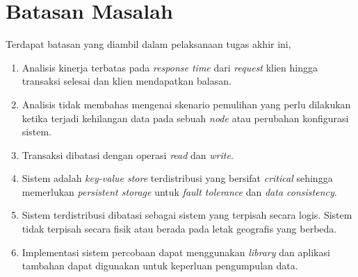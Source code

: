 \section{Batasan Masalah}
\label{sec:batasan-masalah}

Terdapat batasan yang diambil dalam pelaksanaan tugas akhir ini,

\begin{enumerate}
    \item Analisis kinerja terbatas pada \textit{response time} dari \textit{request} klien hingga transaksi selesai dan klien mendapatkan balasan.
    \item Analisis tidak membahas mengenai skenario pemulihan yang perlu dilakukan ketika terjadi kehilangan data pada sebuah \textit{node} atau perubahan konfigurasi sistem. 
    \item Transaksi dibatasi dengan operasi \textit{read} dan \textit{write}.
    \item Sistem adalah \textit{key-value store} terdistribusi yang bersifat \textit{critical} sehingga memerlukan \textit{persistent storage} untuk \textit{fault tolerance} dan \textit{data consistency}.
    \item Sistem terdistribusi dibatasi sebagai sistem yang terpisah secara logis. Sistem tidak terpisah secara fisik atau berada pada letak geografis yang berbeda.
    \item Implementasi sistem percobaan dapat menggunakan \textit{library} dan aplikasi tambahan dapat digunakan untuk keperluan pengumpulan data.
\end{enumerate}
